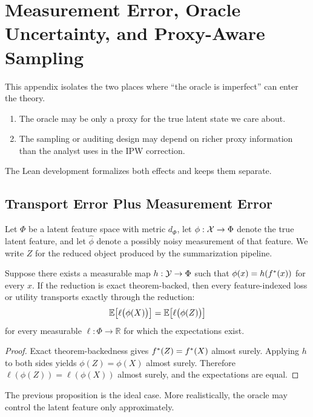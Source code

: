 \section{Measurement Error, Oracle Uncertainty, and Proxy-Aware Sampling}
\label{app:measurement-error}

This appendix isolates the two places where ``the oracle is imperfect'' can
enter the theory.
\begin{enumerate}[nosep]
    \item The oracle may be only a proxy for the true latent state we care
    about.
    \item The sampling or auditing design may depend on richer proxy
    information than the analyst uses in the IPW correction.
\end{enumerate}
The Lean development formalizes both effects and keeps them separate.

\subsection{Transport Error Plus Measurement Error}

Let $\Phi$ be a latent feature space with metric $d_{\Phi}$, let
$\phi:\mathcal{X}\to\Phi$ denote the true latent feature, and let
$\widehat{\phi}$ denote a possibly noisy measurement of that feature. We write
$Z$ for the reduced object produced by the summarization pipeline.

\begin{proposition}
\label{prop:exact-oracle-identification}
Suppose there exists a measurable map $h:\mathcal{Y}\to\Phi$ such that
$\phi(x)=h(f^{\ast}(x))$ for every $x$. If the reduction is exact
theorem-backed, then every feature-indexed loss or utility transports exactly
through the reduction:
\[
\mathbb{E}\!\left[\ell\big(\phi(X)\big)\right]
=
\mathbb{E}\!\left[\ell\big(\phi(Z)\big)\right]
\]
for every measurable $\ell:\Phi\to\mathbb{R}$ for which the expectations exist.
\end{proposition}

\begin{proof}
Exact theorem-backedness gives $f^{\ast}(Z)=f^{\ast}(X)$ almost surely. Applying
$h$ to both sides yields $\phi(Z)=\phi(X)$ almost surely. Therefore
$\ell(\phi(Z))=\ell(\phi(X))$ almost surely, and the expectations are equal.
\end{proof}

The previous proposition is the ideal case. More realistically, the oracle may
control the latent feature only approximately.

